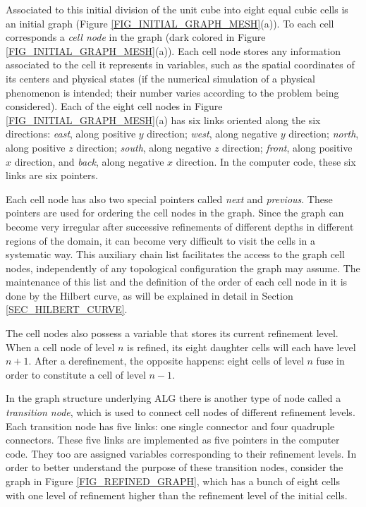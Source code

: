 Associated to this initial division of the unit cube into eight
equal cubic cells is an initial graph (Figure
\ref{FIG_INITIAL_GRAPH_MESH}(a)). To each cell corresponds a
\textit{cell node} in the graph (dark colored in Figure
\ref{FIG_INITIAL_GRAPH_MESH}(a)). Each cell node stores any
information associated to the cell it represents in variables, such
as the spatial coordinates of its centers and physical states (if
the numerical simulation of a physical phenomenon is intended; their
number varies according to the problem being considered). Each of
the eight cell nodes in Figure \ref{FIG_INITIAL_GRAPH_MESH}(a) has
six links oriented along the six directions: \textit{east}, along
positive $y$ direction; \textit{west}, along negative $y$ direction;
\textit{north}, along positive $z$ direction; \textit{south}, along
negative $z$ direction; \textit{front}, along positive $x$
direction, and \textit{back}, along negative $x$ direction. In the
computer code, these six links are six pointers.

Each cell node has also two special pointers called \textit{next}
and \textit{previous}. These pointers are used for ordering the cell
nodes in the graph. Since the graph can become very irregular after
successive refinements of different depths in different regions of
the domain, it can become very difficult to visit the cells in a
systematic way. This auxiliary chain list facilitates the access to
the graph cell nodes, independently of any topological configuration
the graph may assume. The maintenance of this list and the
definition of the order of each cell node in it is done by the
Hilbert curve, as will be explained in detail in Section
\ref{SEC_HILBERT_CURVE}.

The cell nodes also possess a variable that stores its current
refinement level. When a cell node of level $n$ is refined, its
eight daughter cells will each have level $n+1$. After a
derefinement, the opposite happens: eight cells of level $n$ fuse in
order to constitute a cell of level $n-1$.

In the graph structure underlying ALG there is another type of node
called a \textit{transition node}, which is used to connect cell
nodes of different refinement levels. Each transition node has five
links: one single connector and four quadruple connectors. These
five links are implemented as five pointers in the computer code.
They too are assigned variables corresponding to their refinement
levels. In order to better understand the purpose of these
transition nodes, consider the graph in Figure
\ref{FIG_REFINED_GRAPH}, which has a bunch of eight cells with one
level of refinement higher than the refinement level of the initial
cells.

